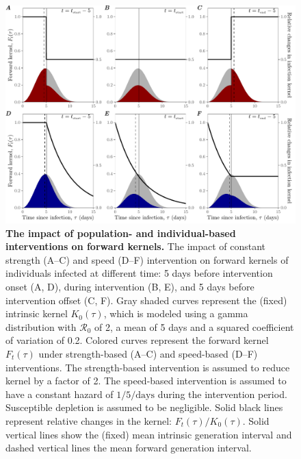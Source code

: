 \documentclass[12pt]{article}
\newcommand{\Rx}[1]{\ensuremath{{\mathcal R}_{#1}}\xspace}
\newcommand{\Ro}{\Rx{0}}
\begin{document}
\begin{figure}[!th]
\includegraphics[width=1\textwidth]{pop_ind_compare.pdf}
\caption{
\textbf{The impact of population- and individual-based interventions on forward kernels.}
The impact of constant strength (A--C) and speed (D--F) intervention on forward kernels of individuals infected at different time:
5 days before intervention onset (A, D), during intervention (B, E), and 5 days before intervention offset (C, F).
Gray shaded curves represent the (fixed) intrinsic kernel $K_0(\tau)$, which is modeled using a gamma distribution with $\Ro$ of 2, a mean of 5 days and a squared coefficient of variation of 0.2.
Colored curves represent the forward kernel $F_t(\tau)$ under strength-based (A--C) and speed-based (D--F) interventions.
The strength-based intervention is assumed to reduce kernel by a factor of 2.
The speed-based intervention is assumed to have a constant hazard of $1/5/\textrm{days}$ during the intervention period.
Susceptible depletion is assumed to be negligible.
Solid black lines represent relative changes in the kernel: $F_t(\tau)/K_0(\tau)$.
Solid vertical lines show the (fixed) mean intrinsic generation interval and dashed vertical lines the mean forward generation interval.
}
\label{fig:indpop}
\end{figure}
\end{document}
